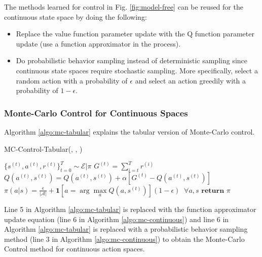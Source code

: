 \documentclass[11pt]{article}
\begin{document}
The methods learned for control in Fig. \ref{fig:model-free} can be reused for the continuous state space by doing the following:

\begin{itemize}
    \item Replace the value function parameter update with the Q function parameter update (use a function approximator in the process). 
    \item Do probabilistic behavior sampling instead of deterministic sampling since continuous state spaces require stochastic sampling. More specifically, select a random action with a probability of $\epsilon$ and select an action greedily with a probability of $1-\epsilon$.
\end{itemize}

\subsubsection{Monte-Carlo Control for Continuous Spaces}

Algorithm \ref{algo:mc-tabular} explains the tabular version of Monte-Carlo control.

\begin{algorithm}[H]
\caption{MC-Control-Tabular(\pi, \epsilon, \alpha)}
\label{algo:mc-tabular}
\begin{algorithmic}[1]
\vspace{0.15cm}
\STATE $\{s^{(t)}, a^{(t)}, r^{(t)}\}_{t=0}^T \sim \mathcal{E}|\pi$
\vspace{0.15cm}
\vspace{0.15cm}
\STATE $G^{(t)} = \sum\limits_{i=t}^T r^{(i)}$\\
\vspace{0.15cm}
\STATE $Q(a^{(t)}, s^{(t)}) = Q(a^{(t)}, s^{(t)}) + \alpha\left[ G^{(t)} - Q(a^{(t)}, s^{(t)})\right]$\\
\vspace{0.15cm}
\STATE $\pi(a|s) = \frac{\epsilon}{|\mathcal{A}|} + \mathbf{1}\left[ a = \arg \max\limits_a Q(a, s^{(t)})\right] (1-\epsilon)\;\; \forall a, s$
\vspace{0.15cm}
\ENDFOR
\ENDFOR
\STATE $\textbf{return } \pi$
\end{algorithmic}
\end{algorithm}

Line 5 in Algorithm \ref{algo:mc-tabular} is replaced with the function approximator update equation (line 6 in Algorithm \ref{algo:mc-continuous}) and line 6 in Algorithm \ref{algo:mc-tabular} is replaced with a probabilistic behavior sampling method (line 3 in Algorithm \ref{algo:mc-continuous}) to obtain the Monte-Carlo Control method for continuous action spaces.
\end{document}
